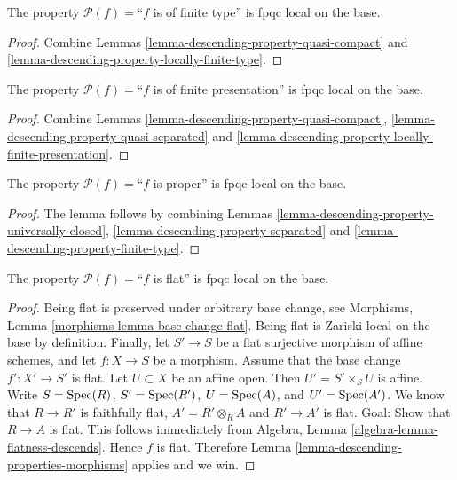 \begin{lemma}
\label{lemma-descending-property-finite-type}
The property $\mathcal{P}(f) =$``$f$ is of finite type''
is fpqc local on the base.
\end{lemma}

\begin{proof}
Combine Lemmas \ref{lemma-descending-property-quasi-compact}
and \ref{lemma-descending-property-locally-finite-type}.
\end{proof}

\begin{lemma}
\label{lemma-descending-property-finite-presentation}
The property $\mathcal{P}(f) =$``$f$ is of finite presentation''
is fpqc local on the base.
\end{lemma}

\begin{proof}
Combine Lemmas \ref{lemma-descending-property-quasi-compact},
\ref{lemma-descending-property-quasi-separated} and
\ref{lemma-descending-property-locally-finite-presentation}.
\end{proof}

\begin{lemma}
\label{lemma-descending-property-proper}
The property $\mathcal{P}(f) =$``$f$ is proper''
is fpqc local on the base.
\end{lemma}

\begin{proof}
The lemma follows by combining
Lemmas \ref{lemma-descending-property-universally-closed},
\ref{lemma-descending-property-separated}
and \ref{lemma-descending-property-finite-type}.
\end{proof}

\begin{lemma}
\label{lemma-descending-property-flat}
The property $\mathcal{P}(f) =$``$f$ is flat''
is fpqc local on the base.
\end{lemma}

\begin{proof}
Being flat is preserved under arbitrary base change, see
Morphisms, Lemma \ref{morphisms-lemma-base-change-flat}.
Being flat is Zariski local on the base by definition.
Finally, let
$S' \to S$ be a flat surjective morphism of affine schemes,
and let $f : X \to S$ be a morphism. Assume that the base change
$f' : X' \to S'$ is flat.
Let $U \subset X$ be an affine open. Then $U' = S' \times_S U$
is affine. Write
$S = \mathop{\mathrm{Spec}}(R)$,
$S' = \mathop{\mathrm{Spec}}(R')$,
$U = \mathop{\mathrm{Spec}}(A)$, and
$U' = \mathop{\mathrm{Spec}}(A')$.
We know that $R \to R'$ is faithfully flat,
$A' = R' \otimes_R A$ and $R' \to A'$ is flat.
Goal: Show that $R \to A$ is flat.
This follows immediately from
Algebra, Lemma \ref{algebra-lemma-flatness-descends}.
Hence $f$ is flat.
Therefore Lemma \ref{lemma-descending-properties-morphisms} applies and we win.
\end{proof}

